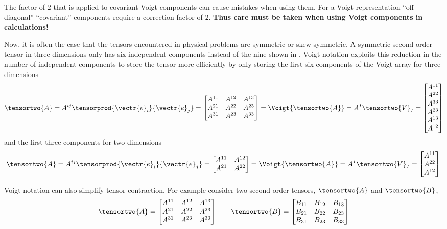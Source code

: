 The factor of $2$ that is applied to covariant Voigt components can
cause mistakes when using them. For a Voigt representation
``off-diagonal'' ``covariant'' components require a correction factor of
$2$. \textbf{Thus care must be taken when using Voigt components in
  calculations!}

Now, it is often the case that the tensors encountered in physical
problems are symmetric or skew-symmetric. A symmetric second order
tensor in three dimensions only has six independent components instead
of the nine shown in
. Voigt notation exploits
this reduction in the number of independent components to store the
tensor more efficiently by only storing the first six components of
the Voigt array for three-dimensions \ie
\begin{equation}
  \tensortwo{A}=A^{ij}\tensorprod{\vectr{e}_{i}}{\vectr{e}_{j}}=\begin{bmatrix}
  A^{11} & A^{12} & A^{13} \\
  A^{21} & A^{22} & A^{23} \\
  A^{31} & A^{23} & A^{33}
  \end{bmatrix} = \Voigt{\tensortwo{A}}=A^{I}\tensortwo{V}_{I}=\begin{bmatrix}
    A^{11} \\
    A^{22} \\
    A^{33} \\
    A^{23} \\
    A^{13} \\
    A^{12}
  \end{bmatrix}    
\end{equation}
and the first three components for two-dimensions \ie
\begin{equation}
  \tensortwo{A}=A^{ij}\tensorprod{\vectr{e}_{i}}{\vectr{e}_{j}}=\begin{bmatrix}
  A^{11} & A^{12} \\
  A^{21} & A^{22}
  \end{bmatrix} = \Voigt{\tensortwo{A}}=A^{I}\tensortwo{V}_{I} = \begin{bmatrix}
    A^{11} \\
    A^{22} \\
    A^{12}
  \end{bmatrix} \\
\end{equation}

Voigt notation can also simplify tensor contraction. For example
consider two second order tensors, $\tensortwo{A}$ and
$\tensortwo{B}$,
\begin{equation}
  \tensortwo{A}=\begin{bmatrix}
  A^{11} & A^{12} & A^{13} \\
  A^{21} & A^{22} & A^{23} \\
  A^{31} & A^{23} & A^{33}
  \end{bmatrix} \qquad \tensortwo{B}=\begin{bmatrix}
  B_{11} & B_{12} & B_{13} \\
  B_{21} & B_{22} & B_{23} \\
  B_{31} & B_{23} & B_{33}
  \end{bmatrix}
\end{equation}

